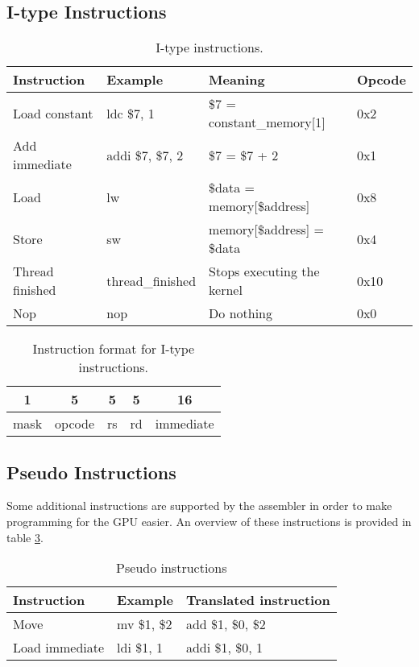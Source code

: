 \documentclass[../main/report.tex]{subfiles}
\begin{document}
\subsection{I-type Instructions}
\begin{table}[H]
    \begin{tabular}{llll}
        \textbf{Instruction} & \textbf{Example} & \textbf{Meaning}          & \textbf{Opcode} \\
        \hline
        \hline
         Load constant       & ldc \$7, 1       & \$7 = constant\_memory[1]  & 0x2 \\
         Add immediate       & addi \$7, \$7, 2 & \$7 = \$7 + 2              & 0x1 \\ \hline
         Load                & lw               & \$data = memory[\$address] & 0x8 \\
         Store               & sw               & memory[\$address] = \$data & 0x4 \\ \hline
         Thread finished     & thread\_finished & Stops executing the kernel & 0x10 \\
         Nop                 & nop              & Do nothing                 & 0x0 \\
    \end{tabular}
    \caption{I-type instructions.}
    \label{table:i_type_instructions}
\end{table}

\begin{table}[H]
    \centering
    \begin{tabular}{|c|c|c|c|c|}
    \multicolumn{1}{c}{1} & \multicolumn{1}{c}{5} & \multicolumn{1}{c}{5}  & \multicolumn{1}{c}{5}  & \multicolumn{1}{c}{16} \\ \hline
    mask & opcode & rs & rd & immediate \\ \hline
    \end{tabular}
    \caption{Instruction format for I-type instructions.}
    \label{table:i_type_format}
\end{table}

\subsection{Pseudo Instructions}

Some additional instructions are supported by the assembler in order to make programming for the GPU easier.
An overview of these instructions is provided in table \ref{table:pseudo_instructions}.

\begin{table}[H]
    \begin{tabular}{lll}
        \textbf{Instruction} & \textbf{Example} & \textbf{Translated instruction} \\
        \hline
        \hline
         Move                & mv \$1, \$2      & add \$1, \$0, \$2               \\
         Load immediate      & ldi \$1, 1       & addi \$1, \$0, 1                \\
    \end{tabular}
    \caption{Pseudo instructions}
    \label{table:pseudo_instructions}
\end{table}
\end{document}
